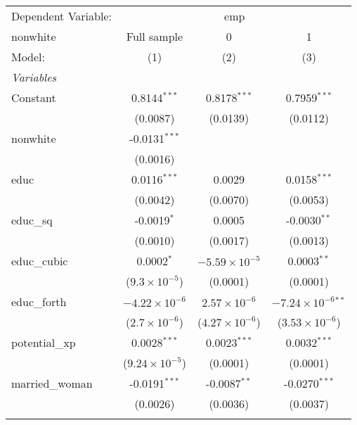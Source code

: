 
\begingroup
\centering
\begin{tabular}{lccc}
   \tabularnewline \midrule \midrule
   Dependent Variable: & \multicolumn{3}{c}{emp}\\
   nonwhite        & Full sample             & 0                       & 1 \\   
   Model:          & (1)                     & (2)                     & (3)\\  
   \midrule
   \emph{Variables}\\
   Constant        & 0.8144$^{***}$          & 0.8178$^{***}$          & 0.7959$^{***}$\\   
                   & (0.0087)                & (0.0139)                & (0.0112)\\   
   nonwhite        & -0.0131$^{***}$         &                         &   \\   
                   & (0.0016)                &                         &   \\   
   educ            & 0.0116$^{***}$          & 0.0029                  & 0.0158$^{***}$\\   
                   & (0.0042)                & (0.0070)                & (0.0053)\\   
   educ\_sq        & -0.0019$^{*}$           & 0.0005                  & -0.0030$^{**}$\\   
                   & (0.0010)                & (0.0017)                & (0.0013)\\   
   educ\_cubic     & 0.0002$^{*}$            & $-5.59\times 10^{-5}$   & 0.0003$^{**}$\\   
                   & ($9.3\times 10^{-5}$)   & (0.0001)                & (0.0001)\\   
   educ\_forth     & $-4.22\times 10^{-6}$   & $2.57\times 10^{-6}$    & $-7.24\times 10^{-6}$$^{**}$\\    
                   & ($2.7\times 10^{-6}$)   & ($4.27\times 10^{-6}$)  & ($3.53\times 10^{-6}$)\\    
   potential\_xp   & 0.0028$^{***}$          & 0.0023$^{***}$          & 0.0032$^{***}$\\   
                   & ($9.24\times 10^{-5}$)  & (0.0001)                & (0.0001)\\   
   married\_woman  & -0.0191$^{***}$         & -0.0087$^{**}$          & -0.0270$^{***}$\\   
                   & (0.0026)                & (0.0036)                & (0.0037)\\   
$$
\end{tabular}

